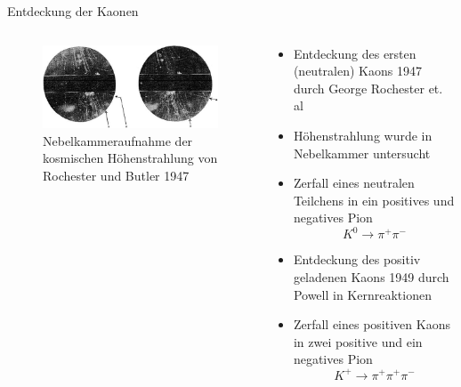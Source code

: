 \documentclass[aspectratio=1610, professionalfonts, 9pt, t]{beamer}
\begin{document}
  \begin{frame}{Entdeckung der Kaonen}
    \begin{columns}[onlytextwidth]
      \begin{column}{0.4\textwidth}
        \begin{figure}[ht]
          \begin{center}
            \includegraphics[height=0.6\textheight]{Images/discoverykaon.png}
            \caption{Nebelkammeraufnahme der kosmischen Höhenstrahlung von Rochester und Butler 1947}
          \end{center}
        \end{figure}
      \end{column}
      \begin{column}{0.5\textwidth}
        \begin{itemize}
          \item Entdeckung des ersten (neutralen) Kaons 1947 durch George Rochester et. al
          \item Höhenstrahlung wurde in Nebelkammer untersucht
          \item Zerfall eines neutralen Teilchens in ein positives und negatives Pion
          \begin{equation*}
            K^{0} \rightarrow \pi^{+} \pi^{-}
          \end{equation*}
          \item Entdeckung des positiv geladenen Kaons 1949 durch Powell in Kernreaktionen
          \item Zerfall eines positiven Kaons in zwei positive und ein negatives Pion
          \begin{equation*}
            K^{+} \rightarrow \pi^{+} \pi^{+} \pi^{-}
          \end{equation*}
        \end{itemize}
      \end{column}
    \end{columns}
  \end{frame}
\end{document}
